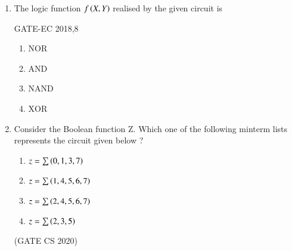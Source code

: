 \begin{enumerate}
\item The logic function $f\left(X,Y\right)$ realised by the given circuit is

\hfill{GATE-EC 2018,8}
		\begin{figure}[H]
\centering
			
			\caption{}
			\label{}
		\end{figure}

\begin{enumerate}
\item  $\text{NOR}$
\item  $\text{AND}$
\item  $\text{NAND}$
\item  $\text{XOR}$
\end{enumerate}


\item Consider the Boolean function Z. Which one of the following minterm lists represents the 
 circuit given below ? 
 \newline
 		\begin{figure}[H]
\centering
			
			\caption{}
			\label{}
		\end{figure}
\begin{enumerate}[label=(\Alph*)]
 \item $z=\sum{\ensuremath{\left(0,1,3,7\right)}}$
 \item $z=\sum{\ensuremath{\left(1,4,5,6,7\right)}}$
 \item $z=\sum{\ensuremath{\left(2,4,5,6,7\right)}}$
 \item $z=\sum{\ensuremath{\left(2,3,5\right)}}$
\end{enumerate}
\hfill (GATE CS 2020)
\end{enumerate}


